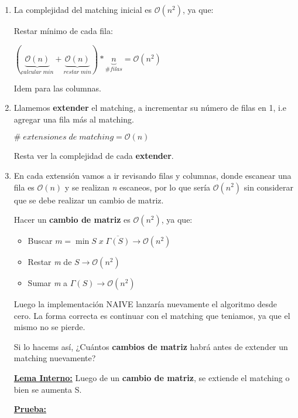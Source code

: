 \documentclass[12pt,a4paper]{report}
\begin{document}
			\begin{enumerate}
				\item La complejidad del matching inicial es $\mathcal{O}(n^{2})$, ya que:
				
					Restar mínimo de cada fila:
					\begin{center}
						$(\underbrace{\mathcal{O}(n)}_{calcular \; min} + \underbrace{\mathcal{O}(n)}_{restar \; min}) * \underbrace{n}_{\# filas} = \mathcal{O}(n^{2})$
					\end{center}
				
				Idem para las columnas.
				
				\item Llamemos \textbf{extender} el matching, a incrementar su número de filas en 1, i.e agregar una fila más al matching.
				\begin{center}
					$ \# \; extensiones \; de \; matching = \mathcal{O}(n)$
				\end{center}
				
				Resta ver la complejidad de cada \textbf{extender}.
				
				\item En cada extensión vamos a ir revisando filas y columnas, donde escanear una fila es $\mathcal{O}(n)$ y se realizan \textit{n} escaneos, por lo que sería $\mathcal{O}(n^{2})$ sin considerar que se debe realizar un cambio de matriz.
				
				Hacer un \textbf{cambio de matriz} es $\mathcal{O}(n^{2})$, ya que:				
				\begin{itemize}
					\item Buscar $\textit{m} = \min S \; x \; \overline{\Gamma(S)} \rightarrow \mathcal{O}(n^{2})$
					\item Restar \textit{m} de $S \rightarrow \mathcal{O}(n^{2})$
					\item Sumar \textit{m} a $\Gamma(S) \rightarrow \mathcal{O}(n^{2})$
				\end{itemize}
				
				Luego la implementación NAIVE lanzaría nuevamente el algoritmo desde cero. La forma correcta es continuar con el matching que teniamos, ya que el mismo no se pierde.
				
				Si lo hacems así, ¿Cuántos \textbf{cambios de matriz} habrá antes de extender un matching nuevamente?
				
				\underline{\textbf{Lema Interno:}} Luego de un \textbf{cambio de matriz}, se extiende el matching o bien se aumenta S.
				
				\underline{\textbf{Prueba:}} 			
				

\end{enumerate}
\end{document}
